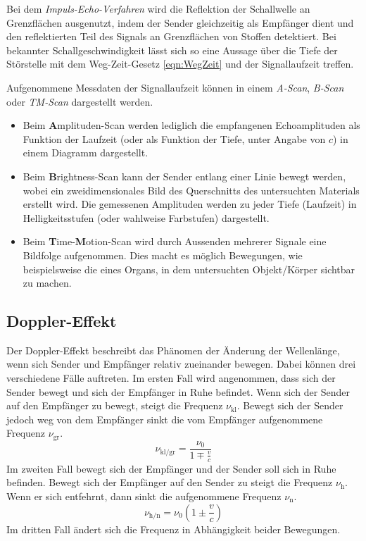 Bei dem \textit{Impuls-Echo-Verfahren} wird die Reflektion der Schallwelle an Grenzflächen ausgenutzt, indem der Sender gleichzeitig als Empfänger dient und den 
reflektierten Teil des Signals an Grenzflächen von Stoffen detektiert. Bei bekannter Schallgeschwindigkeit lässt sich so eine Aussage über die Tiefe der Störstelle 
mit dem Weg-Zeit-Gesetz \eqref{eqn:WegZeit} und der Signallaufzeit treffen.

Aufgenommene Messdaten der Signallaufzeit können in einem \textit{A-Scan}, \textit{B-Scan} oder \textit{TM-Scan} dargestellt werden.
\begin{itemize}
    \item{Beim \textbf{A}mplituden-Scan werden lediglich die empfangenen Echoamplituden als Funktion der Laufzeit (oder als Funktion der Tiefe, unter Angabe von $c$)
    in einem Diagramm dargestellt.}
    \item{Beim \textbf{B}rightness-Scan kann der Sender entlang einer Linie bewegt werden, wobei ein zweidimensionales Bild des Querschnitts des untersuchten Materials
    erstellt wird. Die gemessenen Amplituden werden zu jeder Tiefe (Laufzeit) in Helligkeitsstufen (oder wahlweise Farbstufen) dargestellt.}
    \item{Beim \textbf{T}ime-\textbf{M}otion-Scan wird durch Aussenden mehrerer Signale eine Bildfolge aufgenommen. Dies macht es möglich Bewegungen, wie beispielsweise 
    die eines Organs, in dem untersuchten Objekt/Körper sichtbar zu machen.}
\end{itemize}
\subsection{Doppler-Effekt}
\label{subsec:doppler}
Der Doppler-Effekt beschreibt das Phänomen der Änderung der Wellenlänge, wenn sich Sender und Empfänger relativ zueinander bewegen. Dabei können drei verschiedene Fälle auftreten.
Im ersten Fall wird angenommen, dass sich der Sender bewegt und sich der Empfänger in Ruhe befindet. Wenn sich der Sender auf den Empfänger zu bewegt, steigt die Frequenz $\nu_{\text{kl}}$. Bewegt 
sich der Sender jedoch weg von dem Empfänger sinkt die vom Empfänger aufgenommene Frequenz $\nu_{\text{gr}}$.
\begin{equation*}
    \nu_{\text{kl/gr}} = \frac{\nu_0}{1 \mp \frac{v}{c}} 
\end{equation*}
Im zweiten Fall bewegt sich der Empfänger und der Sender soll sich in Ruhe befinden. Bewegt sich der Empfänger auf den Sender zu steigt die Frequenz $\nu_{\text{h}}$.
Wenn er sich entfehrnt, dann sinkt die aufgenommene Frequenz $\nu_{\text{n}}$. 
\begin{equation*}
    \nu_{\text{h/n}} = \nu_0 \left(1 \pm \frac{v}{c}\right)
\end{equation*}
Im dritten Fall ändert sich die Frequenz in Abhängigkeit beider Bewegungen.
